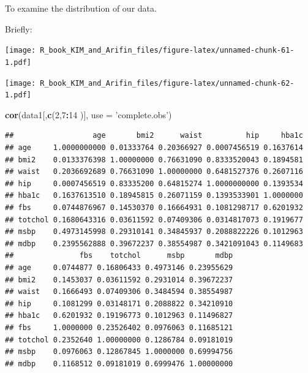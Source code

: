 \documentclass[]{book}
\newenvironment{Shaded}{\begin{snugshade}}{\end{snugshade}}
\newcommand{\KeywordTok}[1]{\textcolor[rgb]{0.13,0.29,0.53}{\textbf{#1}}}
\newcommand{\DataTypeTok}[1]{\textcolor[rgb]{0.13,0.29,0.53}{#1}}
\newcommand{\DecValTok}[1]{\textcolor[rgb]{0.00,0.00,0.81}{#1}}
\newcommand{\StringTok}[1]{\textcolor[rgb]{0.31,0.60,0.02}{#1}}
\newcommand{\OperatorTok}[1]{\textcolor[rgb]{0.81,0.36,0.00}{\textbf{#1}}}
\newcommand{\NormalTok}[1]{#1}
\theoremstyle{definition}
\theoremstyle{definition}
\theoremstyle{remark}
\begin{document}
To examine the distribution of our data.

Briefly:

\begin{Shaded}
\end{Shaded}

\texttt{[image: R\_book\_KIM\_and\_Arifin\_files/figure-latex/unnamed-chunk-61-1.pdf]}

\begin{Shaded}
\end{Shaded}

\texttt{[image: R\_book\_KIM\_and\_Arifin\_files/figure-latex/unnamed-chunk-62-1.pdf]}

\begin{Shaded}
\begin{Highlighting}[]
\KeywordTok{cor}\NormalTok{(data1[,}\KeywordTok{c}\NormalTok{(}\DecValTok{2}\NormalTok{,}\DecValTok{7}\OperatorTok{:}\DecValTok{14}\NormalTok{ )], }\DataTypeTok{use =} \StringTok{'complete.obs'}\NormalTok{)}
\end{Highlighting}
\end{Shaded}

\begin{verbatim}
##                  age       bmi2      waist          hip     hba1c
## age     1.0000000000 0.01333764 0.20366927 0.0007456519 0.1637614
## bmi2    0.0133376398 1.00000000 0.76631090 0.8333520043 0.1894581
## waist   0.2036692689 0.76631090 1.00000000 0.6481527376 0.2607116
## hip     0.0007456519 0.83335200 0.64815274 1.0000000000 0.1393534
## hba1c   0.1637613510 0.18945815 0.26071159 0.1393533901 1.0000000
## fbs     0.0744876967 0.14530370 0.16664931 0.1081298717 0.6201932
## totchol 0.1680643316 0.03611592 0.07409306 0.0314817073 0.1919677
## msbp    0.4973145998 0.29310141 0.34845937 0.2088822226 0.1012963
## mdbp    0.2395562888 0.39672237 0.38554987 0.3421091043 0.1149683
##               fbs    totchol      msbp       mdbp
## age     0.0744877 0.16806433 0.4973146 0.23955629
## bmi2    0.1453037 0.03611592 0.2931014 0.39672237
## waist   0.1666493 0.07409306 0.3484594 0.38554987
## hip     0.1081299 0.03148171 0.2088822 0.34210910
## hba1c   0.6201932 0.19196773 0.1012963 0.11496827
## fbs     1.0000000 0.23526402 0.0976063 0.11685121
## totchol 0.2352640 1.00000000 0.1286784 0.09181019
## msbp    0.0976063 0.12867845 1.0000000 0.69994756
## mdbp    0.1168512 0.09181019 0.6999476 1.00000000
\end{verbatim}
\end{document}
